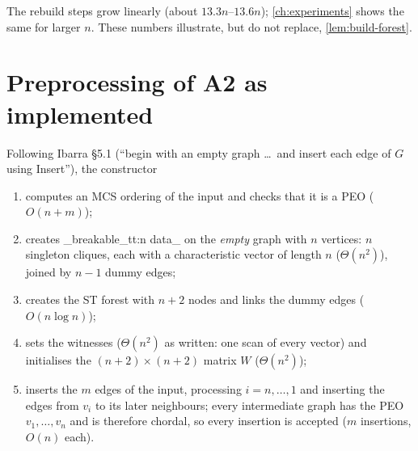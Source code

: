 \documentclass[11pt,a4paper,oneside]{report}
\theoremstyle{plain}
\theoremstyle{definition}
\theoremstyle{remark}
\DeclareRobustCommand{\code}[1]{\mtp_breakable_tt:n {#1}}
\begin{document}
The rebuild steps grow linearly (about \(13.3n\)--\(13.6n\)); \cref{ch:experiments} shows the
same for larger \(n\). These numbers illustrate, but do not replace, \cref{lem:build-forest}.

\section{Preprocessing of A2 as implemented}\label{sec:a2-preprocessing}
Following Ibarra \S5.1 (``begin with an empty graph \ldots\ and insert each edge of \(G\) using
Insert''), the constructor
\begin{enumerate}
\item computes an MCS ordering of the input and checks that it is a PEO (\(O(n+m)\));
\item creates \code{data_} on the \emph{empty} graph with \(n\) vertices: \(n\) singleton
  cliques, each with a characteristic vector of length \(n\) (\(\Theta(n^2)\)), joined by
  \(n-1\) dummy edges;
\item creates the ST forest with \(n+2\) nodes and links the dummy edges (\(O(n\log n)\));
\item sets the witnesses (\(\Theta(n^2)\) as written: one scan of every vector) and initialises
  the \((n+2)\times(n+2)\) matrix \(W\) (\(\Theta(n^2)\));
\item inserts the \(m\) edges of the input, processing \(i=n,\dots,1\) and inserting the edges
  from \(v_i\) to its later neighbours; every intermediate graph has the PEO \(v_1,\dots,v_n\)
  and is therefore chordal, so every insertion is accepted (\(m\) insertions, \(O(n)\) each).
\end{enumerate}
\end{document}
